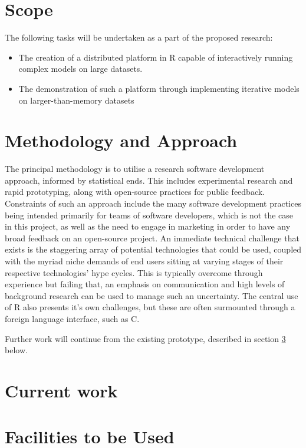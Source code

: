 \documentclass[a4paper,10pt]{article}
\begin{document}
\section{Scope}
The following tasks will be undertaken as a part of the proposed research:

\begin{itemize}
	\item The creation of a distributed platform in R capable of
		interactively running complex models on large datasets.
	\item The demonstration of such a platform through implementing
		iterative models on larger-than-memory datasets
\end{itemize}

\section{Methodology and Approach}

The principal methodology is to utilise a research software development approach, informed by statistical ends.
This includes experimental research and rapid prototyping, along with open-source practices for public feedback.
Constraints of such an approach include the many software development practices being intended primarily for teams of software developers, which is not the case in this project, as well as the need to engage in marketing in order to have any broad feedback on an open-source project.
An immediate technical challenge that exists is the staggering array of potential technologies that could be used, coupled with the myriad niche demands of end users sitting at varying stages of their respective technologies' hype cycles.
This is typically overcome through experience but failing that, an emphasis on communication and high levels of background research can be used to manage such an uncertainty.
The central use of R also presents it's own challenges, but these are often surmounted through a foreign language interface, such as C.

Further work will continue from the existing prototype, described in section \ref{curr} below.

\section{Current work}\label{curr}



\section{Facilities to be Used}
\end{document}
